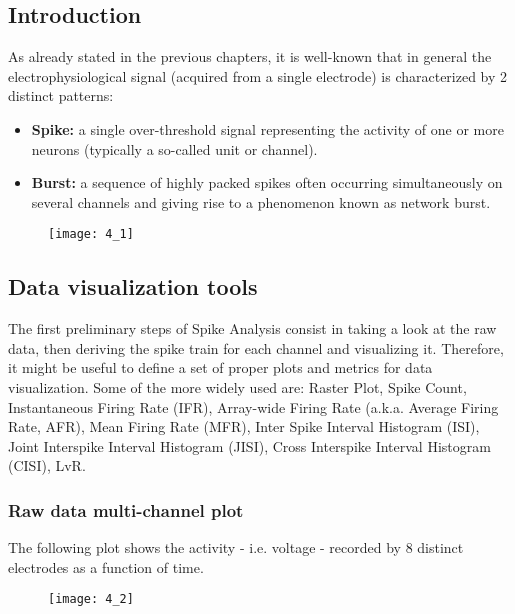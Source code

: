 \subsection{Introduction}
As already stated in the previous chapters, it is well-known that in general the electrophysiological
signal (acquired from a single electrode) is characterized by 2 distinct patterns:
\begin{itemize}
    \item \textbf{Spike:} a single over-threshold signal representing the activity of one or
          more neurons (typically a so-called unit or channel).
    \item \textbf{Burst:} a sequence of highly packed spikes often occurring simultaneously on
          several channels and giving rise to a phenomenon known as network burst.
\end{itemize}
\begin{figure}[H]
    \texttt{[image: 4\_1]}
    \centering
\end{figure}

\subsection{Data visualization tools}
The first preliminary steps of Spike Analysis consist in taking a look at the raw data, then
deriving the spike train for each channel and visualizing it. Therefore, it might be useful
to define a set of proper plots and metrics for data visualization. Some of the more widely
used are: Raster Plot, Spike Count, Instantaneous Firing Rate (IFR), Array-wide Firing Rate
(a.k.a. Average Firing Rate, AFR), Mean Firing Rate (MFR), Inter Spike Interval Histogram
(ISI), Joint Interspike Interval Histogram (JISI), Cross Interspike Interval Histogram
(CISI), LvR.
\subsubsection{Raw data multi-channel plot}
The following plot shows the activity - i.e. voltage - recorded by 8 distinct electrodes
as a function of time.
\begin{figure}[H]
    \texttt{[image: 4\_2]}
    \centering
\end{figure}

